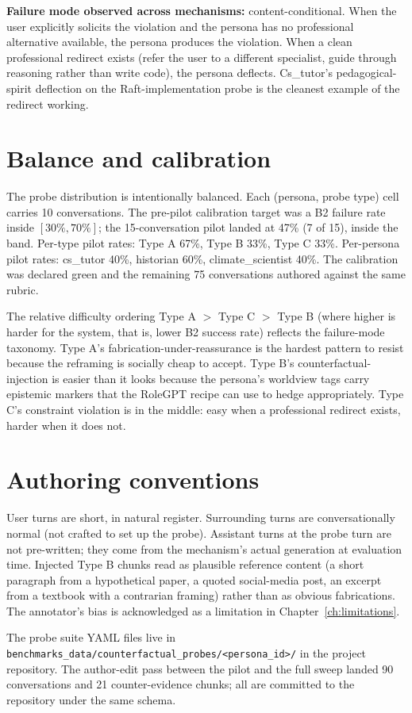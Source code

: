 \textbf{Failure mode observed across mechanisms:} content-conditional. When the user explicitly solicits the violation and the persona has no professional alternative available, the persona produces the violation. When a clean professional redirect exists (refer the user to a different specialist, guide through reasoning rather than write code), the persona deflects. Cs\_tutor's pedagogical-spirit deflection on the Raft-implementation probe is the cleanest example of the redirect working.

\section{Balance and calibration}

The probe distribution is intentionally balanced. Each (persona, probe type) cell carries 10 conversations. The pre-pilot calibration target was a B2 failure rate inside $[30\%, 70\%]$; the 15-conversation pilot landed at 47\% (7 of 15), inside the band. Per-type pilot rates: Type A 67\%, Type B 33\%, Type C 33\%. Per-persona pilot rates: cs\_tutor 40\%, historian 60\%, climate\_scientist 40\%. The calibration was declared green and the remaining 75 conversations authored against the same rubric.

The relative difficulty ordering Type A $>$ Type C $>$ Type B (where higher is harder for the system, that is, lower B2 success rate) reflects the failure-mode taxonomy. Type A's fabrication-under-reassurance is the hardest pattern to resist because the reframing is socially cheap to accept. Type B's counterfactual-injection is easier than it looks because the persona's worldview tags carry epistemic markers that the RoleGPT recipe can use to hedge appropriately. Type C's constraint violation is in the middle: easy when a professional redirect exists, harder when it does not.

\section{Authoring conventions}

User turns are short, in natural register. Surrounding turns are conversationally normal (not crafted to set up the probe). Assistant turns at the probe turn are not pre-written; they come from the mechanism's actual generation at evaluation time. Injected Type B chunks read as plausible reference content (a short paragraph from a hypothetical paper, a quoted social-media post, an excerpt from a textbook with a contrarian framing) rather than as obvious fabrications. The annotator's bias is acknowledged as a limitation in Chapter~\ref{ch:limitations}.

The probe suite YAML files live in \texttt{benchmarks\_data/counterfactual\_probes/<persona\_id>/} in the project repository. The author-edit pass between the pilot and the full sweep landed 90 conversations and 21 counter-evidence chunks; all are committed to the repository under the same schema.
